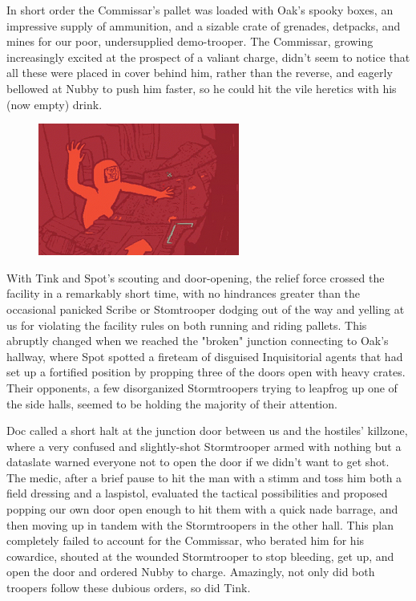 In short order the Commissar's pallet was loaded with Oak's spooky boxes, an impressive supply of ammunition, and a sizable crate of grenades, detpacks, and mines for our poor, undersupplied demo-trooper. 
The Commissar, growing increasingly excited at the prospect of a valiant charge, didn't seem to notice that all these were placed in cover behind him, rather than the reverse, and eagerly bellowed at Nubby to push him faster, so he could hit the vile heretics with his (now empty) drink.

\begin{figure}
	\begin{center}
		\includegraphics[width=\figwidth]{pics/21/102.png}
	\end{center}
\end{figure}
With Tink and Spot's scouting and door-opening, the relief force crossed the facility in a remarkably short time, with no hindrances greater than the occasional panicked Scribe or Stomtrooper dodging out of the way and yelling at us for violating the facility rules on both running and riding pallets. 
This abruptly changed when we reached the "broken" junction connecting to Oak's hallway, where Spot spotted a fireteam of disguised Inquisitorial agents that had set up a fortified position by propping three of the doors open with heavy crates. 
Their opponents, a few disorganized Stormtroopers trying to leapfrog up one of the side halls, seemed to be holding the majority of their attention. 


Doc called a short halt at the junction door between us and the hostiles' killzone, where a very confused and slightly-shot Stormtrooper armed with nothing but a dataslate warned everyone not to open the door if we didn't want to get shot. 
The medic, after a brief pause to hit the man with a stimm and toss him both a field dressing and a laspistol, evaluated the tactical possibilities and proposed popping our own door open enough to hit them with a quick nade barrage, and then moving up in tandem with the Stormtroopers in the other hall. 
This plan completely failed to account for the Commissar, who berated him for his cowardice, shouted at the wounded Stormtrooper to stop bleeding, get up, and open the door and ordered Nubby to charge. 
Amazingly, not only did both troopers follow these dubious orders, so did Tink. 


